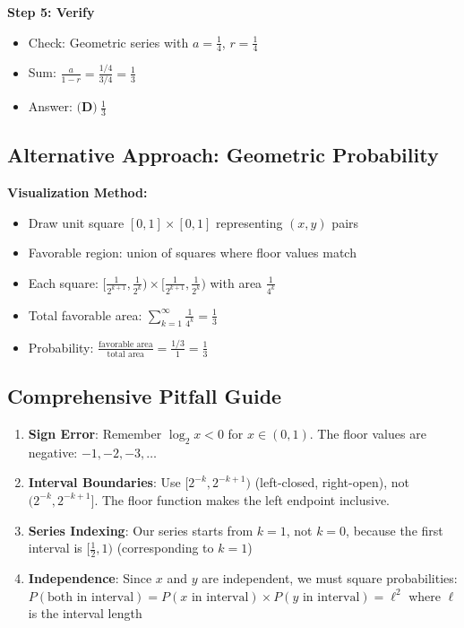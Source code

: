 \documentclass[11pt]{article}
\begin{document}
\begin{solutionbox}
\textbf{Step 5: Verify}
\begin{itemize}
    \item Check: Geometric series with $a = \frac{1}{4}$, $r = \frac{1}{4}$
    \item Sum: $\frac{a}{1-r} = \frac{1/4}{3/4} = \frac{1}{3}$ \checkmark
    \item Answer: $\boxed{\textbf{(D)}\ \frac{1}{3}}$
\end{itemize}

\subsection*{Alternative Approach: Geometric Probability}
\textbf{Visualization Method:}
\begin{itemize}
    \item Draw unit square $[0,1] \times [0,1]$ representing $(x,y)$ pairs
    \item Favorable region: union of squares where floor values match
    \item Each square: $[\frac{1}{2^{k+1}}, \frac{1}{2^k}) \times [\frac{1}{2^{k+1}}, \frac{1}{2^k})$ with area $\frac{1}{4^k}$
    \item Total favorable area: $\sum_{k=1}^{\infty} \frac{1}{4^k} = \frac{1}{3}$
    \item Probability: $\frac{\text{favorable area}}{\text{total area}} = \frac{1/3}{1} = \frac{1}{3}$
\end{itemize}

\subsection*{Comprehensive Pitfall Guide}
\begin{enumerate}
    \item \textbf{Sign Error}: Remember $\log_2 x < 0$ for $x \in (0,1)$. The floor values are negative: $-1, -2, -3, \ldots$
    
    \item \textbf{Interval Boundaries}: Use $[2^{-k}, 2^{-k+1})$ (left-closed, right-open), not $(2^{-k}, 2^{-k+1}]$. The floor function makes the left endpoint inclusive.
    
    \item \textbf{Series Indexing}: Our series starts from $k=1$, not $k=0$, because the first interval is $[\frac{1}{2}, 1)$ (corresponding to $k=1$)
    
    \item \textbf{Independence}: Since $x$ and $y$ are independent, we must square probabilities: $P(\text{both in interval}) = P(x \text{ in interval}) \times P(y \text{ in interval}) = \ell^2$ where $\ell$ is the interval length
    

\end{enumerate}
\end{solutionbox}
\end{document}
